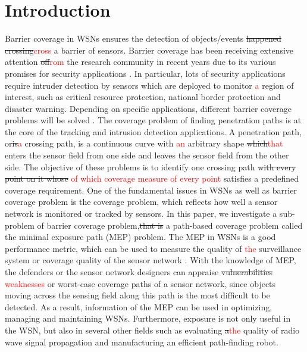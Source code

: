 \documentclass[final]{elsarticle}
\begin{document}
\section{Introduction}
Barrier coverage in WSNs ensures the detection of objects/events \sout{happened crossing}\textcolor{red}{cross} a barrier of sensors. Barrier coverage has been receiving extensive attention \sout{of}\textcolor{red}{from} the research community in recent years due to its various promises for security applications \cite{wu2016survey,wang2011coverage,b15}. In particular, lots of security applications require intruder detection by sensors which are deployed to monitor \textcolor{red}{a} region of interest, such as critical resource protection, national border protection and disaster warning. Depending on specific applications, different barrier coverage problems will be solved . The coverage problem of finding penetration paths is at the core of the tracking and intrusion detection applications. A penetration path, or\sout{is}\textcolor{red}{a} crossing path, is a continuous curve with \textcolor{red}{an} arbitrary shape \sout{which}\textcolor{red}{that} enters the sensor field from one side and leaves the sensor field from the other side. The objective of these problems is to identify one crossing path \sout{with every point on it whose} \textcolor{red}{of which coverage measure of every point} satisfies a predefined coverage requirement. One of the fundamental issues in WSNs as well as barrier coverage problem is the coverage problem, which reflects how well a sensor network is monitored or tracked by sensors. In this paper, we investigate a sub-problem of barrier coverage problem,\sout{that is} a path-based coverage problem called the minimal exposure path (MEP) problem. The MEP in WSNs is a good performance metric, which can be used to measure the quality of \textcolor{red}{the} surveillance system or coverage quality of the sensor network \cite{b13,b17}. With the knowledge of MEP, the defenders or the sensor network designers can appraise \sout{vulnerabilities} \textcolor{red}{weaknesses} or worst-case coverage paths of a sensor network, since objects moving across the sensing field along this path is the most difficult to be detected. As a result, information of the MEP can be used in optimizing, managing and maintaining WSNs. Furthermore, exposure is not only useful in the WSN, but also in several other fields such as evaluating \sout{a}\textcolor{red}{the} quality of radio wave signal propagation and manufacturing an efficient path-finding robot.
\end{document}
